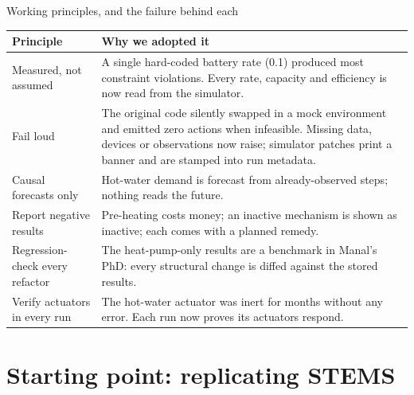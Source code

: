 \documentclass[aspectratio=169,10pt]{beamer}
\begin{document}
\begin{frame}{Working principles, and the failure behind each}
\small
\begin{tabularx}{\textwidth}{@{}>{\raggedright\arraybackslash}p{}X@{}}
\toprule
\textbf{Principle} & \textbf{Why we adopted it} \\
\midrule
Measured, not assumed & A single hard-coded battery rate (0.1) produced most constraint violations. Every rate, capacity and efficiency is now read from the simulator. \\
Fail loud & The original code silently swapped in a mock environment and emitted zero actions when infeasible. Missing data, devices or observations now raise; simulator patches print a banner and are stamped into run metadata. \\
Causal forecasts only & Hot-water demand is forecast from already-observed steps; nothing reads the future. \\
Report negative results & Pre-heating costs money; an inactive mechanism is shown as inactive; each comes with a planned remedy. \\
Regression-check every refactor & The heat-pump-only results are a benchmark in Manal's PhD: every structural change is diffed against the stored results. \\
Verify actuators in every run & The hot-water actuator was inert for months without any error. Each run now proves its actuators respond. \\
\bottomrule
\end{tabularx}
\end{frame}

\section{Starting point: replicating STEMS}
\end{document}

